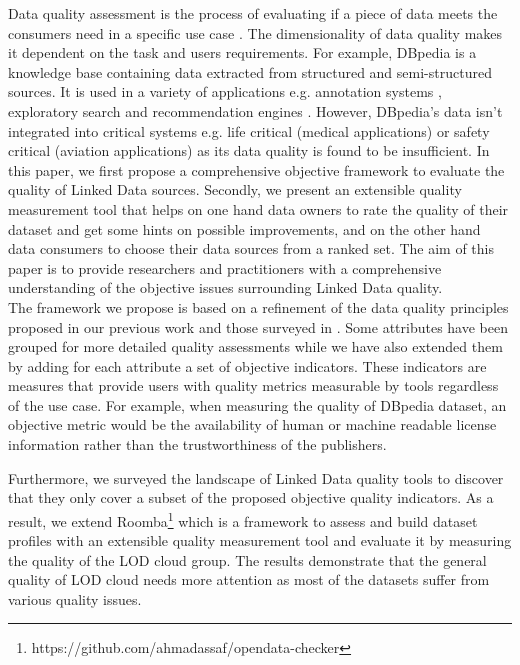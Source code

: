 \documentclass[onecolumn, crcready]{iosart2c}
\begin{document}
Data quality assessment is the process of evaluating if a piece of data meets the consumers need in a specific use case \cite{Bizer:2009:QIF:1482178.1482280}. The dimensionality of data quality makes it dependent on the task and users requirements. For example, DBpedia \cite{bizer_dbpedia_2009} is a knowledge base containing data extracted from structured and semi-structured sources. It is used in a variety of applications  e.g. annotation systems \cite{Mendes:2011:DSS:2063518.2063519}, exploratory search \cite{Marie:2013:DHO:2506182.2506185} and recommendation engines \cite{conf/iir/MirizziNROS12}. However, DBpedia's data isn't integrated into critical systems e.g. life critical (medical applications) or safety critical (aviation applications) as its data quality is found to be insufficient. In this paper, we first propose a comprehensive objective framework to evaluate the quality of Linked Data sources. Secondly, we present an extensible quality measurement tool that helps on one hand data owners to rate the quality of their dataset and get some hints on possible improvements, and on the other hand data consumers to choose their data sources from a ranked set. The aim of this paper is to provide researchers and practitioners with a comprehensive understanding of the objective issues surrounding Linked Data quality.\\

The framework we propose is based on a refinement of the data quality principles proposed in our previous work \cite{assaf2012} and those surveyed in \cite{Framework2012}. Some attributes have been grouped for more detailed quality assessments while we have also extended them by adding for each attribute a set of objective indicators. These indicators are measures that provide users with quality metrics measurable by tools regardless of the use case. For example, when measuring the quality of DBpedia dataset, an objective metric would be the availability of human or machine readable license information rather than the trustworthiness of the publishers.

Furthermore, we surveyed the landscape of Linked Data quality tools to discover that they only cover a subset of the proposed objective quality indicators. As a result, we extend Roomba\footnote{https://github.com/ahmadassaf/opendata-checker} which is a framework to assess and build dataset profiles with an extensible quality measurement tool and evaluate it by measuring the quality of the LOD cloud group. The results demonstrate that the general quality of LOD cloud needs more attention as most of the datasets suffer from various quality issues.\\
\end{document}
